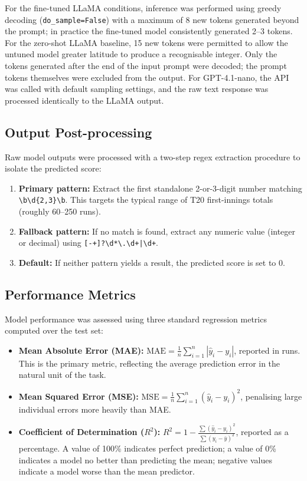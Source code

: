 For the fine-tuned LLaMA conditions, inference was performed using greedy decoding (\texttt{do\_sample=False}) with a maximum of 8 new tokens generated beyond the prompt; in practice the fine-tuned model consistently generated 2--3 tokens. For the zero-shot LLaMA baseline, 15 new tokens were permitted to allow the untuned model greater latitude to produce a recognisable integer. Only the tokens generated after the end of the input prompt were decoded; the prompt tokens themselves were excluded from the output. For GPT-4.1-nano, the API was called with default sampling settings, and the raw text response was processed identically to the LLaMA output.

\subsection{Output Post-processing}

Raw model outputs were processed with a two-step regex extraction procedure to isolate the predicted score:

\begin{enumerate}
    \item \textbf{Primary pattern:} Extract the first standalone 2-or-3-digit number matching \texttt{\textbackslash b\textbackslash d\{2,3\}\textbackslash b}. This targets the typical range of T20 first-innings totals (roughly 60–250 runs).
    \item \textbf{Fallback pattern:} If no match is found, extract any numeric value (integer or decimal) using \texttt{[-+]?\textbackslash d*\textbackslash.\textbackslash d+|\textbackslash d+}.
    \item \textbf{Default:} If neither pattern yields a result, the predicted score is set to 0.
\end{enumerate}

\subsection{Performance Metrics}

Model performance was assessed using three standard regression metrics computed over the test set:

\begin{itemize}
    \item \textbf{Mean Absolute Error (MAE):} $\text{MAE} = \frac{1}{n}\sum_{i=1}^{n}|{\hat{y}_i - y_i}|$, reported in runs. This is the primary metric, reflecting the average prediction error in the natural unit of the task.
    \item \textbf{Mean Squared Error (MSE):} $\text{MSE} = \frac{1}{n}\sum_{i=1}^{n}(\hat{y}_i - y_i)^2$, penalising large individual errors more heavily than MAE.
    \item \textbf{Coefficient of Determination ($R^2$):} $R^2 = 1 - \frac{\sum(\hat{y}_i - y_i)^2}{\sum(y_i - \bar{y})^2}$, reported as a percentage. A value of 100\% indicates perfect prediction; a value of 0\% indicates a model no better than predicting the mean; negative values indicate a model worse than the mean predictor.
\end{itemize}

